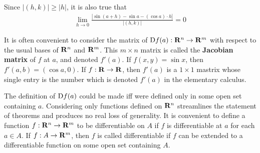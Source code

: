 Since $|(h, k)| \ge |h|$, it is also true that 
\begin{align*}
    \lim_{h\to 0}{\frac{|\sin(a+h) - \sin a - (\cos a)\cdot h|}{|(h, k)|}} = 0
\end{align*}

It is often convenient to consider the matrix of $\mathrm{D}f(a): \mathbf{R}^n\to \mathbf{R}^m$ 
with respect to the usual bases of $\mathbf{R}^n$ and $\mathbf{R}^m$. This $m\times n$ 
matrix is called the \textbf{Jacobian matrix} of $f$ at $a$, and denoted $f'(a)$.
If $f(x, y) = \sin x$, then $f'(a, b) = (\cos a, 0)$. If $f:\mathbf{R}\to \mathbf{R}$, then 
$f'(a)$ is a $1\times 1$ mastrix whose single entry is the number which is denoted
$f'(a)$ in the elementary calculus.

The definition of $\mathrm{D}f(a)$ could be made iff were defined only
in some open set containing $a$. Considering only functions
defined on $\mathbf{R}^n$ streamlines the statement of theorems and
produces no real loss of generality. It is convenient to define
a function $f:\mathbf{R}^n\to \mathbf{R}^m$ to be differentiable on $A$ if $f$ 
is differentiable at $a$ for each $a\in A$. If $f:A \to \mathbf{R}^m$, 
then $f$ is called differentiable if $f$ can be extended to a 
differentiable function on some open set containing $A$.

